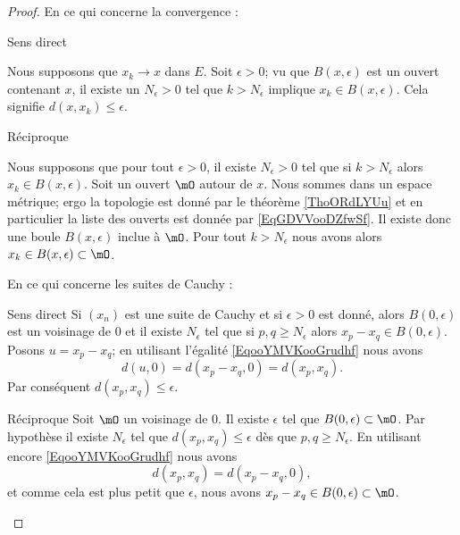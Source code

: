 \begin{proof}
   En ce qui concerne la convergence :   
    \begin{subproof}
        \item[Sens direct]

            Nous supposons que \( x_k\to x\) dans \( E\). Soit \( \epsilon>0\); vu que \( B(x,\epsilon)\) est un ouvert contenant \( x\), il existe un \( N_{\epsilon}>0 \) tel que \( k>N_{\epsilon}\) implique \( x_k\in B(x,\epsilon)\). Cela signifie \( d(x,x_k)\leq \epsilon\).

        \item[Réciproque]

            Nous supposons que pour tout \( \epsilon>0\), il existe \( N_{\epsilon}>0\) tel que si \( k>N_{\epsilon}\) alors \( x_k\in B(x,\epsilon)\). Soit un ouvert \( \mO\) autour de \( x\). Nous sommes dans un espace métrique; ergo la topologie est donné par le théorème \ref{ThoORdLYUu} et en particulier la liste des ouverts est donnée par \eqref{EqGDVVooDZfwSf}. Il existe donc une boule \( B(x,\epsilon)\) inclue à \( \mO\). Pour tout \( k>N_{\epsilon}\) nous avons alors \( x_k\in B(x,\epsilon)\subset\mO\). 
    \end{subproof}
    En ce qui concerne les suites de Cauchy :
    \begin{subproof}
    \item[Sens direct]
        Si \( (x_n)\) est une suite de Cauchy et si \( \epsilon>0\) est donné, alors \( B(0,\epsilon)\) est un voisinage de \( 0\) et il existe \( N_{\epsilon}\) tel que si \( p,q\geq N_{\epsilon}\) alors \( x_p-x_q\in B(0,\epsilon)\). Posons \( u=x_p-x_q\); en utilisant l'égalité \eqref{EqooYMVKooGrudhf} nous avons
        \begin{equation}
            d(u,0)=d(x_p-x_q,0)=d(x_p,x_q).
        \end{equation}
        Par conséquent \( d(x_p,x_q)\leq \epsilon\).
    \item[Réciproque]
        Soit \( \mO\) un voisinage de \( 0\). Il existe \( \epsilon\) tel que \( B(0,\epsilon)\subset \mO\). Par hypothèse il existe \( N_{\epsilon}\) tel que \( d(x_p,x_q)\leq \epsilon\) dès que \( p,q\geq N_{\epsilon}\). En utilisant encore \eqref{EqooYMVKooGrudhf} nous avons
        \begin{equation}
            d(x_p,x_q)=d(x_p-x_q,0),
        \end{equation}
        et comme cela est plus petit que \( \epsilon\), nous avons \( x_p-x_q\in B(0,\epsilon)\subset\mO\).
    \end{subproof}
\end{proof}

